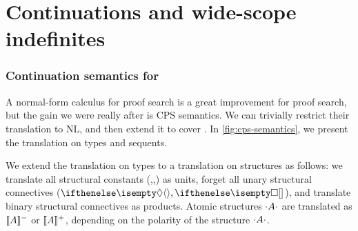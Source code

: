 \documentclass[10pt,a4paper]{llncs}
\begin{document}
\section{Continuations and wide-scope indefinites}
\subsubsection*{Continuation semantics for {\NLCL}}
\label{sec:continuation-semantics}
A normal-form calculus for proof search is a great improvement for
proof search, but the gain we were really after is  CPS semantics.
We can trivially restrict their translation to NL, and then extend
it to cover {\NLCL}.
In \autoref{fig:cps-semantics}, we present the translation on types
and sequents.

We extend the translation on types to a translation on structures as
follows: we translate all structural constants (\I,\B,\C) as units,
forget all unary structural connectives ($\di,\sq$), and translate
binary structural connectives as products. Atomic structures $\cdot A \cdot$
are translated as $\llbracket A\rrbracket^-$ or $\llbracket A\rrbracket^+$, depending on the polarity
of the structure $\cdot A \cdot$.
\end{document}

